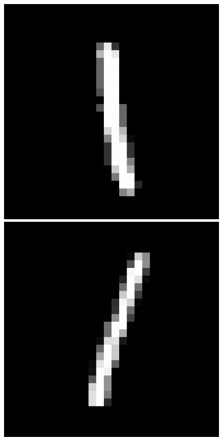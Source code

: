 \begin{figure}
\begin{minipage}{0.2\textwidth}
            \captionsetup{labelformat=empty}
            \addtocounter{figure}{-1}
        \end{minipage}
        \begin{minipage}{0.2\textwidth}
            \centering
            \includegraphics[width=0.95\linewidth]{c3_figures/samples/322_0.png}
            \captionsetup{labelformat=empty}
            \addtocounter{figure}{-1}
        \end{minipage}
        \begin{minipage}{0.2\textwidth}
            \centering
            \includegraphics[width=0.95\linewidth]{c3_figures/samples/euclid_3233_1.png}

\end{minipage}
\end{figure}
